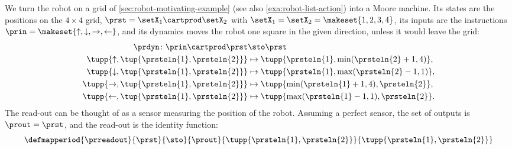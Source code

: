 \begin{example}
    \label{exa:robot_on_a_grid}
    \begin{marginfigure}
        \centering
        \caption{Robot on a grid example. }
        \label{fig:robot_example_again}
    \end{marginfigure}
    We turn the robot on a grid of \cref{sec:robot-motivating-example} (see also \cref{exa:robot-list-action}) into a Moore machine.
    Its states are the positions on the $4 \times 4$ grid, $\prst = \setX_1 \cartprod \setX_2$ with $\setX_1 = \setX_2 = \makeset{1, 2, 3, 4}$, its inputs are the instructions $\prin=\makeset{\uparrow, \downarrow,\rightarrow,\leftarrow}$, and its dynamics moves the robot one square in the given direction, unless it would leave the grid:
    \begin{equation}
        \begin{aligned}
            \prdyn\colon \prin \cartprod \prst                & \sto \prst \\
            \tupp{\uparrow, \tup{\prsteln{1},\prsteln{2}}}    & \mapsto \tupp{\prsteln{1}, \min(\prsteln{2}+1,4)}, \\
            \tupp{\downarrow, \tup{\prsteln{1},\prsteln{2}}}  & \mapsto \tupp{\prsteln{1}, \max(\prsteln{2}-1,1)}, \\
            \tupp{\rightarrow, \tup{\prsteln{1},\prsteln{2}}} & \mapsto \tupp{\min(\prsteln{1}+1,4), \prsteln{2}}, \\
            \tupp{\leftarrow, \tup{\prsteln{1},\prsteln{2}}}  & \mapsto \tupp{\max(\prsteln{1}-1,1), \prsteln{2}}.
        \end{aligned}
    \end{equation}
    The read-out can be thought of as a sensor measuring the position of the robot.
    Assuming a perfect sensor, the set of outputs is $\prout = \prst$, and the read-out is the identity function:
    \begin{equation*}
        \defmapperiod{\prreadout}
        {\prst}
        {\sto}
        {\prout}
        {\tupp{\prsteln{1},\prsteln{2}}}
        {\tupp{\prsteln{1},\prsteln{2}}}
    \end{equation*}
\end{example}

